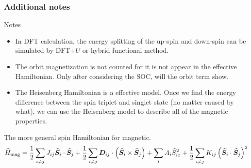 \documentclass{beamer}
\begin{document}
  \begin{frame}
    \frametitle{Additional notes}
    \begin{block}{Notes}
      \begin{itemize}
        \item In DFT calculation, the energy splitting of the up-spin and down-spin can be simulated by DFT+\(U\) or hybrid functional method.
        \item The orbit magnetization is not counted for it is not appear in the effective Hamiltonian. Only after considering the SOC, will the orbit term show.
        \item The Heisenberg Hamiltonian is a effective model. Once we find the energy difference between the spin triplet and singlet state (no matter caused by what), we can use the Heisenberg model to describe all of the magnetic properties.
      \end{itemize}
    \end{block}
    The more general spin Hamiltonian for magnetic.
    \begin{equation}\scriptsize
      \widehat{H}_{\text{mag}} = \dfrac{1}{2}\sum_{i\ne{}j}J_{ij}\widehat{\bm{S}}_i\cdot\widehat{\bm{S}}_j + \dfrac{1}{2}\sum_{i\ne{}j}\bm{D}_{ij}\cdot\left(\widehat{\bm{S}}_i\times\widehat{\bm{S}}_j\right) + \sum_i A_i\widehat{S}_{iz}^2 + \dfrac{1}{2}\sum_{i\ne{}j}K_{ij}\left(\widehat{\bm{S}}_i\cdot\widehat{\bm{S}}_j\right)^2
    \end{equation}
  \end{frame}
\end{document}

